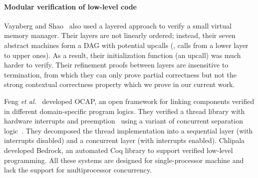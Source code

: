 \paragraph{Modular verification of low-level code} 
Vaynberg and Shao~\cite{vaynberg12} also used a layered approach to
verify a small virtual memory manager. Their layers are not linearly
ordered; instead, their seven abstract machines form a DAG with
potential upcalls (\ie, calls from a lower layer to upper ones). As a
result, their initialization function (an upcall) was much harder to
verify. Their refinement proofs between layers are insensitive to
termination, from which they can only prove partial correctness but
not the strong contextual correctness property which we prove in our
current work.

Feng {\em et al.}~\cite{feng08:vstte} developed OCAP, an open
framework for linking components verified in different
domain-specific program logics. They verified a
thread library with hardware interrupts and
preemption~\cite{feng08:aim} using a variant of concurrent
separation logic~\cite{ohearn:concur04}. They decomposed the thread
implementation into a sequential layer (with interrupts disabled)
and a concurrent layer (with interrupts enabled).
Chlipala~\cite{BedrockPLDI11} developed Bedrock, an automated
Coq library to support verified low-level programming. All these
systems are designed for single-processor machine 
and lack the support for multiprocessor concurrency.

